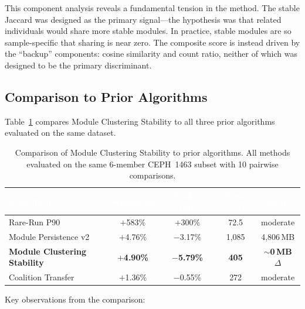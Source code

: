 \documentclass{../yalumba}
\begin{document}
This component analysis reveals a fundamental tension in the method.  The
stable Jaccard was designed as the primary signal---the hypothesis was that
related individuals would share more stable modules.  In practice, stable
modules are so sample-specific that sharing is near zero.  The composite score
is instead driven by the ``backup'' components: cosine similarity and count
ratio, neither of which was designed to be the primary discriminant.

\subsection{Comparison to Prior Algorithms}

Table~\ref{tab:comparison} compares Module Clustering Stability to all three
prior algorithms evaluated on the same dataset.

\begin{table}[H]
  \centering
  \tablestyle
  \caption{Comparison of Module Clustering Stability to prior algorithms.
    All methods evaluated on the same 6-member CEPH~1463 subset with
    10 pairwise comparisons.}
  \label{tab:comparison}
  \begin{tabular}{lcccc}
    \toprule
    \rowcolor{table-header}
    \textcolor{white}{\textbf{Algorithm}} &
    \textcolor{white}{\textbf{Separation}} &
    \textcolor{white}{\textbf{Weakest Gap}} &
    \textcolor{white}{\textbf{Time (s)}} &
    \textcolor{white}{\textbf{Heap}} \\
    \midrule
    Rare-Run P90
      & $+$583\% & $+$300\% & 72.5 & moderate \\
    Module Persistence v2
      & $+$4.76\% & $-$3.17\% & 1{,}085 & 4{,}806\,MB \\
    \textbf{Module Clustering Stability}
      & \textbf{$+$4.90\%} & \textbf{$-$5.79\%} & \textbf{405} & \textbf{$\sim$0\,MB $\Delta$} \\
    Coalition Transfer
      & $+$1.36\% & $-$0.55\% & 272 & moderate \\
    \bottomrule
  \end{tabular}
\end{table}

Key observations from the comparison:
\end{document}
